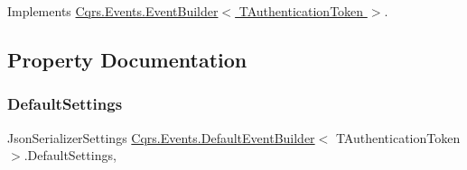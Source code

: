 Implements \hyperlink{classCqrs_1_1Events_1_1EventBuilder_aefa7bfaea90123e143e108d46efc6603_aefa7bfaea90123e143e108d46efc6603}{Cqrs.\+Events.\+Event\+Builder$<$ T\+Authentication\+Token $>$}.



\subsection{Property Documentation}
\mbox{\label{classCqrs_1_1Events_1_1DefaultEventBuilder_aabead59863bacfed527d85ea789ab881_aabead59863bacfed527d85ea789ab881}} 
\subsubsection{\texorpdfstring{Default\+Settings}{DefaultSettings}}
{\footnotesize\ttfamily Json\+Serializer\+Settings \hyperlink{classCqrs_1_1Events_1_1DefaultEventBuilder}{Cqrs.\+Events.\+Default\+Event\+Builder}$<$ T\+Authentication\+Token $>$.Default\+Settings\hspace{0.3cm}{\ttfamily [static]}, {\ttfamily [get]}}

